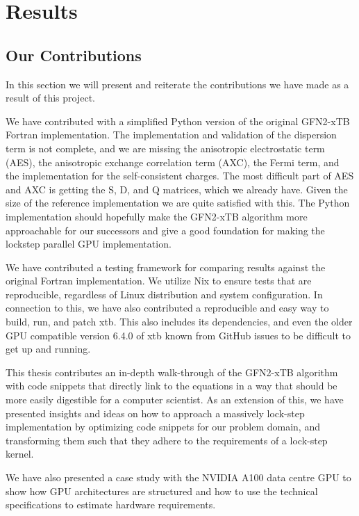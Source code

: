 \chapter{Results}

\section{Our Contributions}

In this section we will present and reiterate the contributions we have made as a result of this project.

We have contributed with a simplified Python version of the original GFN2-xTB Fortran implementation. The implementation and validation of the dispersion term is not complete, and we are missing the anisotropic electrostatic term (AES), the anisotropic exchange correlation term (AXC), the Fermi term, and the implementation for the self-consistent charges. The most difficult part of AES and AXC is getting the S, D, and Q matrices, which we already have. Given the size of the reference implementation we are quite satisfied with this. The Python implementation should hopefully make the GFN2-xTB algorithm more approachable for our successors and give a good foundation for making the lockstep parallel GPU implementation.

We have contributed a testing framework for comparing results against the original Fortran implementation. We utilize Nix to ensure tests that are reproducible, regardless of Linux distribution and system configuration. In connection to this, we have also contributed a reproducible and easy way to build, run, and patch xtb. This also includes its dependencies, and even the older GPU compatible version 6.4.0 of xtb known from GitHub issues to be difficult to get up and running.

This thesis contributes an in-depth walk-through of the GFN2-xTB algorithm with code snippets that directly link to the equations in a way that should be more easily digestible for a computer scientist. As an extension of this, we have presented insights and ideas on how to approach a massively lock-step implementation by optimizing code snippets for our problem domain, and transforming them such that they adhere to the requirements of a lock-step kernel.

We have also presented a case study with the NVIDIA A100 data centre GPU to show how GPU architectures are structured and how to use the technical specifications to estimate hardware requirements.

